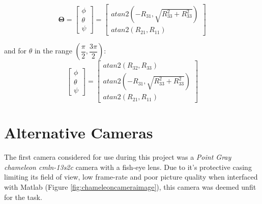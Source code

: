 \documentclass{UoNMCHA}
\numberwithin{equation}{section}
\begin{document}
\begin{equation}
	\mathbf{\Theta} =
	\begin{bmatrix}
	\phi \\ \theta \\\psi 
	\end{bmatrix}
	= 
	\begin{bmatrix}
	atan2(-R_{31} , \sqrt{R_{33}^{2} + R_{33}^{2}}) \\
	atan2(R_{21} , R_{11}) 
	\end{bmatrix}
\end{equation}

and for $\theta$ in the range $(\dfrac{\pi}{2} , \dfrac{3\pi}{2})$:
\begin{equation}
	\begin{bmatrix}
	\phi \\ \theta \\\psi 
	\end{bmatrix}
	= 
	\begin{bmatrix}
	atan2(R_{32} , R_{33}) \\
	atan2(-R_{31} , \sqrt{R_{33}^{2} + R_{33}^{2}}) \\
	atan2(R_{21} , R_{11}) 
	\end{bmatrix}
\end{equation}

\section{Alternative Cameras}\label{App:Alternative Cameras}

The first camera considered for use during this project was a \textit{Point Gray chameleon cmln-13s2c} camera with a fish-eye lens. Due to it's protective casing limiting its field of view, low frame-rate and poor picture quality when interfaced with Matlab (Figure \ref{fig:chameleoncameraimage}), this camera was deemed unfit for the task.\\
\end{document}
